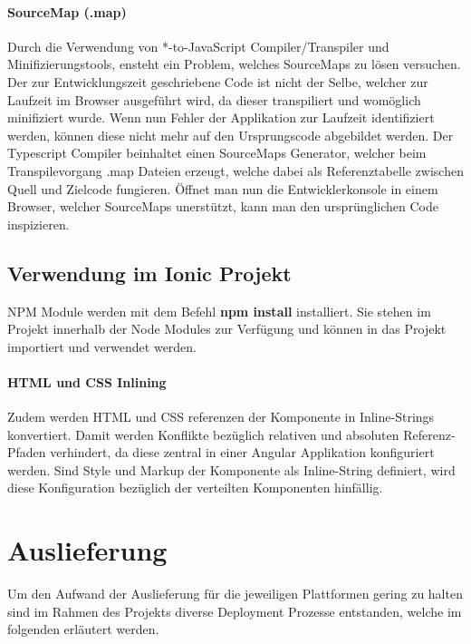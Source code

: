 \paragraph{SourceMap (.map)}

Durch die Verwendung von *-to-JavaScript Compiler/Transpiler und Minifizierungstools, ensteht ein Problem, welches SourceMaps zu lösen versuchen.
Der zur Entwicklungszeit geschriebene Code ist nicht der Selbe, welcher zur Laufzeit im Browser ausgeführt wird, da dieser transpiliert und womöglich minifiziert wurde.
Wenn nun Fehler der Applikation zur Laufzeit identifiziert werden, können diese nicht mehr auf den Ursprungscode abgebildet werden.
Der Typescript Compiler beinhaltet einen SourceMaps Generator, welcher beim Transpilevorgang .map Dateien erzeugt,
welche dabei als Referenztabelle zwischen Quell und Zielcode fungieren.
Öffnet man nun die Entwicklerkonsole in einem Browser, welcher SourceMaps unerstützt, kann man den ursprünglichen Code inspizieren.
\cite{Using97:online}



\subsection{Verwendung im Ionic Projekt}

\ac{NPM} Module werden mit dem Befehl \textbf{npm install} installiert.
Sie stehen im Projekt innerhalb der Node Modules zur Verfügung und können in das Projekt importiert und verwendet werden.




\paragraph{HTML und CSS Inlining}
Zudem werden \ac{HTML} und \ac{CSS} referenzen der Komponente in Inline-Strings konvertiert.
Damit werden Konflikte bezüglich relativen und absoluten Referenz-Pfaden verhindert,
da diese zentral in einer Angular Applikation konfiguriert werden.
Sind Style und Markup der Komponente als Inline-String definiert,
wird diese Konfiguration bezüglich der verteilten Komponenten hinfällig.
\cite{ludoh30:online}

\newpage
\section{Auslieferung}

Um den Aufwand der Auslieferung für die jeweiligen Plattformen gering zu halten
sind im Rahmen des Projekts \projectname{} diverse Deployment Prozesse entstanden,
welche im folgenden erläutert werden.

